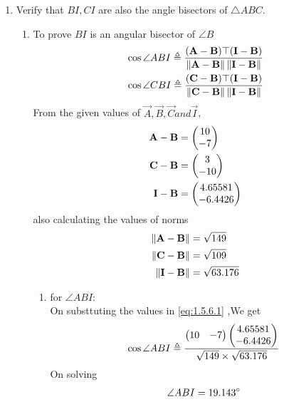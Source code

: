 \documentclass[11pt]{book}
\begin{document}
\begin{enumerate}[label=\thesection.\arabic*.,ref=\thesection.\theenumi]
\item Verify that $BI, CI$ are also the angle bisectors of $\triangle ABC$. \\
\solution
\begin{enumerate}
    \item To prove $BI$ is an angular bisector of $ \angle B$
\begin{align}
\label{eq:1.5.6.1}
\cos{\angle ABI} \triangleq \frac{(\vec{A}-\vec{B})\top(\vec{I}-\vec{B})}{\norm{\vec{A}-\vec{B}}\norm{\vec{I}-\vec{B}}} \\
\cos{\angle CBI} \triangleq \frac{(\vec{C}-\vec{B})\top(\vec{I}-\vec{B})}{\norm{\vec{C}-\vec{B}}\norm{\vec{I}-\vec{B}}} 
\end{align}
From the given values of $\vec{A},\vec{B},\vec{C} and \vec{I}$,\\
\begin{align}
	\mathbf{A}-\mathbf{B} &=\begin{pmatrix}10\\-7\end{pmatrix} \\
	\mathbf{C}-\mathbf{B}&= \begin{pmatrix}3\\-10\end{pmatrix} \\
 \mathbf{I}-\mathbf{B}  &=\begin{pmatrix}4.65581 \\ -6.4426\end{pmatrix}
\end{align}
also calculating the values of norms
\begin{align}
	\left\lVert\mathbf{A}-\mathbf{B}\right\rVert &= \sqrt{149}\\
	\left\lVert\mathbf{C}-\mathbf{B}\right\rVert &= \sqrt{109} \\
 	\left\lVert\mathbf{I}-\mathbf{B}\right\rVert &= \sqrt{63.176}\\
\end{align}


\begin{enumerate}
    \item for $\angle ABI$: \\
    On substtuting the values in  \eqref{eq:1.5.6.1} ,We get 
    \begin{align}
        \cos{\angle ABI} \triangleq \frac{\begin{pmatrix} 10 & -7\end{pmatrix}\begin{pmatrix}4.65581 \\ -6.4426\end{pmatrix}}{ \sqrt{149}\times \sqrt{63.176}} \\
    \end{align}
    On solving 
    \begin{align}
        \angle ABI = 19.143\degree
    \end{align}
    

\end{enumerate}
\end{enumerate}
\end{enumerate}
\end{document}
